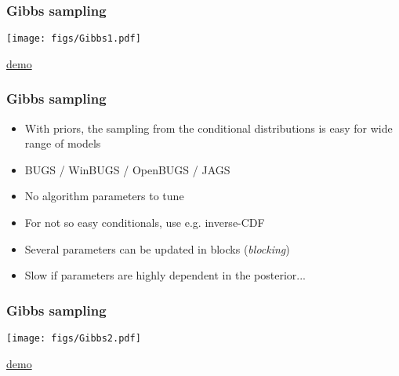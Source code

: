 \documentclass[10pt]{beamer}
\begin{document}
\begin{frame}

\frametitle{Gibbs sampling}

    \vspace{-.5\baselineskip}
     \begin{center}
       \texttt{[image: figs/Gibbs1.pdf]}
     \end{center}
    \vspace{-.5\baselineskip}
     \begin{center}
       \href{https://github.com/MansMeg/BSDA/blob/main/lectures/L5/figs/gibbs_example.gif}{demo}
     \end{center}
\end{frame}

\begin{frame}

\frametitle{ Gibbs sampling}

  \vspace{-0.5\baselineskip}
  \begin{itemize}
  \item With  priors, the sampling from
    the conditional distributions is easy for wide range of models
  \item<2-> BUGS / WinBUGS / OpenBUGS / JAGS
  \item<3-> No algorithm parameters to tune
  \item<4-> For not so easy conditionals, use  e.g. inverse-CDF
  \item<5-> Several parameters can be updated in blocks ({\em blocking})
  \item<6-> Slow if parameters are highly dependent in the posterior...
  \end{itemize}

\end{frame}

\begin{frame}
\frametitle{Gibbs sampling}

    \vspace{-.5\baselineskip}
     \begin{center}
       \texttt{[image: figs/Gibbs2.pdf]}
     \end{center}
    \vspace{-.5\baselineskip}
     \begin{center}
       \href{https://github.com/MansMeg/BSDA/blob/main/lectures/L5/figs/gibbs_example_correlated.gif}{demo}
     \end{center}
\end{frame}
\end{document}
